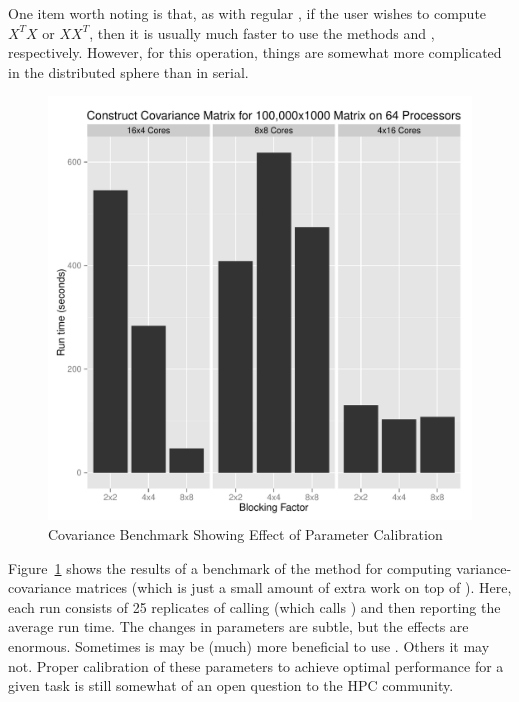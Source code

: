One item worth noting is that, as with regular , if the user wishes to compute $X^TX$ or $XX^T$, then it is usually much faster to use the methods  and , respectively.  However, for this operation, things are somewhat more complicated in the distributed sphere than in serial.  
\begin{figure}[ht]
\centering
\includegraphics[scale=.6]{pbdDEMO-include/pics/cov.pdf}
\caption[Covariance Benchmark]{Covariance Benchmark Showing Effect of Parameter Calibration}\label{fig:cov}
\end{figure}
Figure~\ref{fig:cov} shows the results of a benchmark of the  method for computing variance-covariance matrices (which is just a small amount of extra work on top of ).  Here, each run consists of 25 replicates of calling  (which calls ) and then reporting the average run time.  The changes in parameters are subtle, but the effects are enormous.  Sometimes is may be (much) more beneficial to use .  Others it may not.  Proper calibration of these parameters to achieve optimal performance for a given task is still somewhat of an open question to the HPC community.





